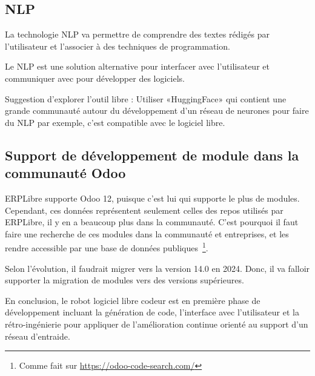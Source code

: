 \subsection{NLP}
La technologie NLP va permettre de comprendre des textes rédigés par l’utilisateur et l’associer à des techniques de programmation.



Le NLP est une solution alternative pour interfacer avec l’utilisateur et communiquer avec pour développer des logiciels.

Suggestion d’explorer l’outil libre : Utiliser «HuggingFace» qui contient une grande communauté autour du développement d’un réseau de neurones pour faire du NLP par exemple, c’est compatible avec le logiciel libre.

\subsection{Support de développement de module dans la communauté Odoo}

ERPLibre supporte Odoo 12, puisque c’est lui qui supporte le plus de modules. Cependant, ces données représentent seulement celles des repos utilisés par ERPLibre, il y en a beaucoup plus dans la communauté. C’est pourquoi il faut faire une recherche de ces modules dans la communauté et entreprises, et les rendre accessible par une base de données publiques~\footnote{Comme fait sur \url{https://odoo-code-search.com/}}.

Selon l’évolution, il faudrait migrer vers la version 14.0 en 2024. Donc, il va falloir supporter la migration de modules vers des versions supérieures.







En conclusion, le robot logiciel libre codeur est en première phase de développement incluant la génération de code, l'interface avec l'utilisateur et la rétro-ingénierie pour appliquer de l'amélioration continue orienté au support d'un réseau d'entraide.
